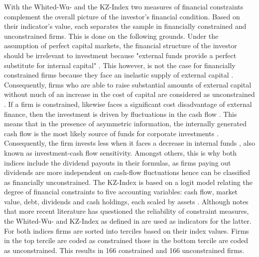 \documentclass[12pt]{article}
\begin{document}
With the Whited-Wu- and the KZ-Index two measures of financial constraints complement the overall picture of the investor's financial condition. Based on their indicator's value, each separates the sample in financially constrained and unconstrained firms. This is done on the following grounds. Under the assumption of perfect capital markets, the financial structure of the investor should be irrelevant to investment because "external funds provide a perfect substitute for internal capital" \citep[p. 141]{Fazzari2016}. This however, is not the case for financially constrained firms because they face an inelastic supply of external capital \citep[p.1]{Farre-mensa2013}. Consequently, firms who are able to raise substantial amounts of external capital without much of an increase in the cost of capital are considered as unconstrained \citep[p.1]{Farre-mensa2013}. If a firm is constrained, likewise faces a significant cost disadvantage of external finance, then the investment is driven by fluctuations in the cash flow \citep[p. 142]{Fazzari1988}. This means that in the presence of asymmetric information, the internally generated cash flow is the most likely source of funds for corporate investments \citep[p.450]{Bhagat2005}. Consequently, the firm invests less when it faces a decrease in internal funds \citep[p.451]{Bhagat2005}, also known as investment-cash flow sensitivity. Amongst others, this is why both indices include the dividend payouts in their formulas, as firms paying out dividends are more independent on cash-flow fluctuations hence can be classified as financially unconstrained.
The KZ-Index is based on a logit model relating the degree of financial constraints to five accounting variables: cash flow, market value, debt, dividends and cash holdings, each scaled by assets \citep[p.5]{Farre-mensa2013}. Although \citet{Khatami2014} notes that more recent literature has questioned the reliability of constraint measures, the Whited-Wu- and KZ-Index as defined in \citet{Farre-mensa2013} are used as indicators for the latter. For both indices firms are sorted into terciles based on their index values. Firms in the top tercile are coded as constrained those in the bottom tercile are coded as unconstrained. This results in 166 constrained and 166 unconstrained firms.
\end{document}
